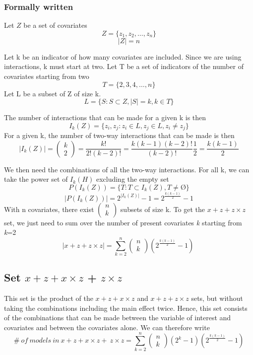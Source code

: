 \subsubsection{Formally written}
Let $Z$ be a set of covariates 
\[Z=\{\left.z_1,z_2,\dots ,z_n\right.\}\] 
\[|Z|=n\] 

Let k be an indicator of how many covariates are included. Since we are using interactions, k must start at two. Let T be a set of indicators of the number of covariates starting from two
\[T=\{\left.2,3,4,\dots ,n\right.\}\] 
Let L be a subset of Z of size k.
\[L=\{\left.S:S\subset Z,\left|S\right|=k,k\in T\right.\}\] 

\noindent The number of interactions that can be made for a given k is then
\[I_k\left(Z\right)=\{\left.\left.z_i,z_j\right.:z_i\in L,z_j\in L,z_i\neq z_j\right.\}\] 
For a given k, the number of two-way interactions that can be made is then
\[\left|I_k\left(Z\right)\right|=\left( \begin{array}{c}
k \\ 
2 \end{array}
\right)=\frac{k!}{2!\left(k-2\right)!}=\frac{k\left(k-1\right)\left(k-2\right)!}{\left(k-2\right)!}\frac{1}{2}=\frac{k\left(k-1\right)}{2}\] 

We then need the combinations of all the two-way interactions. For all k, we can take the power set of $I_k\left(H\right)$ excluding the empty set
\[P\left(I_k\left(Z\right)\right)=\{\left.T:T\subset I_k\left(Z\right),T\neq \textrm{\O}\right.\}\] 
\[\left|P\left(I_k\left(Z\right)\right)\right|=2^{\left|I_k\left(Z\right)\right|}-1=2^{\frac{k\left(k-1\right)}{2}}-1\] 
With n covariates, there exist $\left( \begin{array}{c}
n \\ 
k \end{array}
\right)$ subsets of size k. To get the $x + z + z \times z$ set, we just need to sum over the number of present covariates \textit{k} starting from \textit{k}=2
\[\left|x + z+z \times z\right|=\sum^n_{k=2}{\left( \begin{array}{c}
n \\ 
k \end{array}
\right)}\left(2^{\frac{k\left(k-1\right)}{2}}-1\right)\ \] 

\subsection{Set $x + z + x \times z$ + $z \times z$}
This set is the product of the $x + z + x \times z$ and $x + z + z \times z$ sets, but without taking the combinations including the main effect twice. Hence, this set consists of the combinations that can be made between the variable of interest and covariates and between the covariates alone. We can therefore write 
\[\#\ of\ models\ in\ x + z + x \times z+\ z \times z=\sum^n_{k=2}{\left( \begin{array}{c}
n \\ 
k \end{array}
\right)\left(2^k-1\right)\left(2^{\frac{k\left(k-1\right)}{2}}-1\right)}\] 
